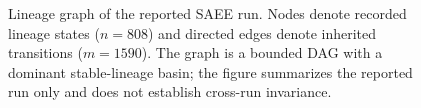 \begin{figure}[t]
\centering
{}
\caption{Lineage graph of the reported SAEE run. Nodes denote recorded lineage
states ($n=808$) and directed edges denote inherited transitions ($m=1590$).
The graph is a bounded DAG with a dominant stable-lineage basin; the figure
summarizes the reported run only and does not establish cross-run invariance.}
\label{fig:lineage-dag}
\end{figure}
